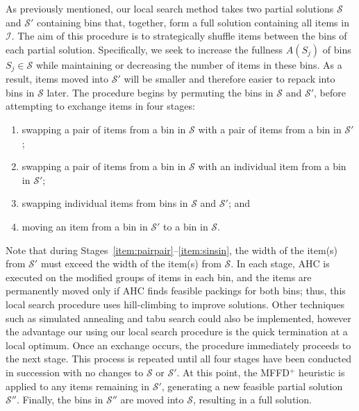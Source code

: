 \documentclass[a4paper,11pt,authoryear]{elsarticle}
\begin{document}
\noindent As previously mentioned, our local search method takes two partial solutions $\mathcal{S}$ and $\mathcal{S}'$ containing bins that, together, form a full solution containing all items in $\mathcal{I}$. The aim of this procedure is to strategically shuffle items between the bins of each partial solution. Specifically, we seek to increase the fullness $A(S_j)$ of bins $S_j \in \mathcal{S}$ while maintaining or decreasing the number of items in these bins. As a result, items moved into $\mathcal{S}'$ will be smaller and therefore easier to repack into bins in $\mathcal{S}$ later. The procedure begins by permuting the bins in $\mathcal{S}$ and $\mathcal{S}'$, before attempting to exchange items in four stages:
\begin{enumerate}[label={(\arabic*)},itemsep=-0.2em]
	\item swapping a pair of items from a bin in $\mathcal{S}$ with a pair of items from a bin in $\mathcal{S}'$;\label{item:pairpair}
	\item swapping a pair of items from a bin in $\mathcal{S}$ with an individual item from a bin in $\mathcal{S}'$;\label{item:pairsin}
	\item swapping individual items from bins in $\mathcal{S}$ and $\mathcal{S}'$;\label{item:sinsin} and
	\item moving an item from a bin in $\mathcal{S}'$ to a bin in $\mathcal{S}$.\label{item:movesin}
\end{enumerate} 
Note that during Stages~\ref{item:pairpair}--\ref{item:sinsin}, the width of the item(s) from $\mathcal{S}'$ must exceed the width of the item(s) from $\mathcal{S}$. In each stage, AHC is executed on the modified groups of items in each bin, and the items are permanently moved only if AHC finds feasible packings for both bins; thus, this local search procedure uses hill-climbing to improve solutions. Other techniques such as simulated annealing and tabu search could also be implemented, however the advantage our using our local search procedure is the quick termination at a local optimum. Once an exchange occurs, the procedure immediately proceeds to the next stage. This process is repeated until all four stages have been conducted in succession with no changes to $\mathcal{S}$ or $\mathcal{S}'$. At this point, the MFFD$^+$ heuristic is applied to any items remaining in $\mathcal{S}'$, generating a new feasible partial solution $\mathcal{S}''$. Finally, the bins in $\mathcal{S}''$ are moved into $\mathcal{S}$, resulting in a full solution.
\end{document}
